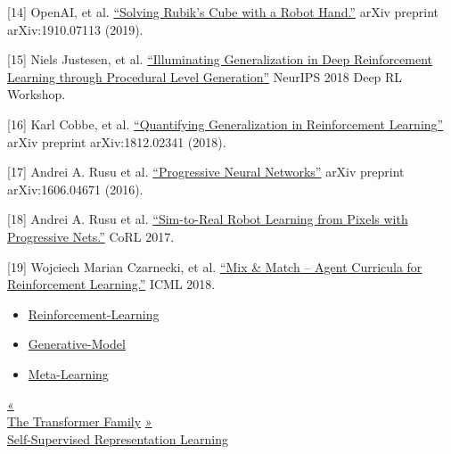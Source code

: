 {[}14{]} OpenAI, et al. \href{https://arxiv.org/abs/1910.07113}{``Solving Rubik's Cube with a Robot Hand.''} arXiv preprint arXiv:1910.07113 (2019).

{[}15{]} Niels Justesen, et al. \href{https://arxiv.org/abs/1806.10729}{``Illuminating Generalization in Deep Reinforcement Learning through Procedural Level Generation''} NeurIPS 2018 Deep RL Workshop.

{[}16{]} Karl Cobbe, et al. \href{https://arxiv.org/abs/1812.02341}{``Quantifying Generalization in Reinforcement Learning''} arXiv preprint arXiv:1812.02341 (2018).

{[}17{]} Andrei A. Rusu et al. \href{https://arxiv.org/abs/1606.04671}{``Progressive Neural Networks''} arXiv preprint arXiv:1606.04671 (2016).

{[}18{]} Andrei A. Rusu et al. \href{https://arxiv.org/abs/1610.04286}{``Sim-to-Real Robot Learning from Pixels with Progressive Nets.''} CoRL 2017.

{[}19{]} Wojciech Marian Czarnecki, et al. \href{https://arxiv.org/abs/1806.01780}{``Mix \& Match -- Agent Curricula for Reinforcement Learning.''} ICML 2018.

\begin{itemize}
\tightlist
\item
  \href{https://lilianweng.github.io/tags/reinforcement-learning/}{Reinforcement-Learning}
\item
  \href{https://lilianweng.github.io/tags/generative-model/}{Generative-Model}
\item
  \href{https://lilianweng.github.io/tags/meta-learning/}{Meta-Learning}
\end{itemize}

\href{https://lilianweng.github.io/posts/2020-04-07-the-transformer-family/}{{« }\\
{The Transformer Family}} \href{https://lilianweng.github.io/posts/2019-11-10-self-supervised/}{{ »}\\
{Self-Supervised Representation Learning}}


